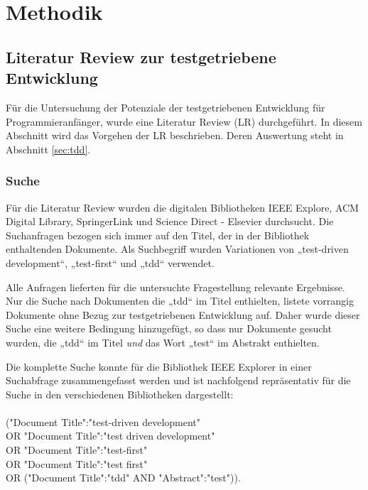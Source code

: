 
\section{Methodik} \label{sec:methodik}

\subsection{Literatur Review zur testgetriebene Entwicklung} \label{sec:tddMethode}
Für die Untersuchung der Potenziale der testgetriebenen Entwicklung für Programmieranfänger, wurde eine Literatur Review (LR) durchgeführt. In diesem Abschnitt wird das Vorgehen der LR beschrieben. Deren Auswertung steht in Abschnitt \ref{sec:tdd}.

\subsubsection{Suche} Für die Literatur Review wurden die digitalen Bibliotheken IEEE Explore, ACM Digital Library, SpringerLink und Science Direct - Elsevier durchsucht. Die Suchanfragen bezogen sich immer auf den Titel, der in der Bibliothek enthaltenden Dokumente. Als Suchbegriff wurden Variationen von „test-driven development“, „test-first“ und „tdd“ verwendet.

Alle Anfragen lieferten für die untersuchte Fragestellung relevante Ergebnisse. Nur die Suche nach Dokumenten die „tdd“ im Titel enthielten, listete vorrangig Dokumente ohne Bezug zur testgetriebenen Entwicklung auf. Daher wurde dieser Suche eine weitere Bedingung hinzugefügt, so dass nur Dokumente gesucht wurden, die „tdd“ im Titel \textit{und} das Wort „test“ im Abstrakt enthielten.

Die komplette Suche konnte für die Bibliothek IEEE Explorer in einer Suchabfrage zusammengefasst werden und ist nachfolgend repräsentativ für die Suche in den verschiedenen Bibliotheken dargestellt:\\
\\
\textsf{("Document Title":"test-driven development"{}\\
OR "Document Title":"test driven development"{}\\
OR "Document Title":"test-first"{}\\
OR "Document Title":"test first"{}\\
OR ("Document Title":"tdd"{} AND "{}Abstract":"test"))}.\\

